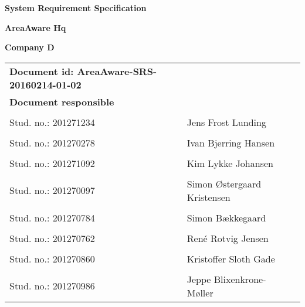 
\centerline{\Huge\bfseries\color{ThemeColor} System Requirement Specification } 

\vspace{1em}
\centerline{\Large\bfseries\color{BlackColor} AreaAware Hq} 

\vspace{5em}
\centerline{\large\bfseries\color{BlackColor}Company D} 




\begin{center}
	\begin{tabular}{ l l p{6cm} }
		\textbf{Document id: AreaAware-SRS-20160214-01-02}& & \\
		\textbf{Document responsible}& & \\
		& & \\
		Stud. no.:  201271234 & Jens Frost Lunding & \\\hline
		& & \\
		Stud. no.:  201270278 & Ivan Bjerring Hansen & \\\hline
		& & \\
		Stud. no.:  201271092 & Kim Lykke Johansen & \\\hline
		& & \\	
		Stud. no.:  201270097 & Simon Østergaard Kristensen & \\\hline
		& & \\
		Stud. no.:  201270784 & Simon Bækkegaard & \\\hline
		& & \\
		Stud. no.: 	201270762 & René Rotvig Jensen & \\\hline
		& & \\
		Stud. no.: 	201270860 & Kristoffer Sloth Gade & \\\hline
		& & \\
		Stud. no.: 	201270986 & Jeppe Blixenkrone-Møller & \\\hline
	\end{tabular}     	
\end{center}
\thispagestyle{empty} %
\restoregeometry



		